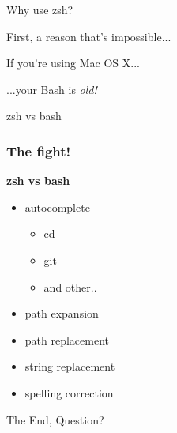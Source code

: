 \documentclass[aspectratio=169]{beamer}
\begin{document}

\begin{frame}
    \Huge{\centerline{Why use zsh?}}
\end{frame}

\begin{frame}
    \Huge{\centerline{First, a reason that's impossible...}}
\end{frame}

\begin{frame}
    \Huge{\centerline{If you're using Mac OS X...}}
\end{frame}

\begin{frame}
    \Huge{\centerline{...your Bash is \textit{old!}}}
    	\begin{figure}[h!]
		\end{figure}	
\end{frame}

\begin{frame}
    \Huge{\centerline{zsh vs bash}}
\end{frame}

\begin{frame}
	\frametitle{ The fight!}
	\textbf{zsh vs bash}
	\begin{itemize}
		\item autocomplete
		\begin{itemize}
			\item cd
			\item git
			\item and other..
		\end{itemize}
		\item path expansion
		\item path replacement
		\item string replacement
		\item spelling correction
	\end{itemize}
\end{frame}



\begin{frame}
    \Huge{\centerline{The End, Question?}}
\end{frame}

\end{document}
